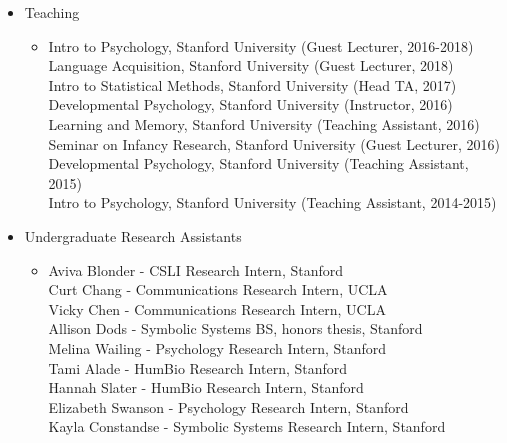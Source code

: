 \documentclass[10pt]{article}
\newenvironment{outerlist}[1][\enskip\textbullet]%
        {\begin{itemize}[#1,leftmargin=*]}{\end{itemize}%
         \vspace{-.6\baselineskip}}
\newenvironment{innerlist}[1][\enskip\textbullet]%
        {\begin{itemize}[#1,leftmargin=*,parsep=0pt,itemsep=0pt,topsep=0pt,partopsep=0pt]}
        {\end{itemize}}
\begin{document}
\begin{outerlist}

\item[] Teaching

\begin{innerlist}
\item[] Intro to Psychology, Stanford University (Guest Lecturer, 2016-2018)\\
        Language Acquisition, Stanford University (Guest Lecturer, 2018)\\
        Intro to Statistical Methods, Stanford University (Head TA, 2017)\\
        Developmental Psychology, Stanford University (Instructor, 2016)\\
        Learning and Memory, Stanford University (Teaching Assistant, 2016)\\
        Seminar on Infancy Research, Stanford University (Guest Lecturer, 2016)\\
        Developmental Psychology, Stanford University (Teaching Assistant, 2015)\\
        Intro to Psychology, Stanford University (Teaching Assistant, 2014-2015)
\end{innerlist}

\item[] Undergraduate Research Assistants

\begin{innerlist}
\item[] Aviva Blonder - CSLI Research Intern, Stanford\\
        Curt Chang - Communications Research Intern, UCLA \\
        Vicky Chen - Communications Research Intern, UCLA \\
        Allison Dods - Symbolic Systems BS, honors thesis, Stanford\\
        Melina Wailing - Psychology Research Intern, Stanford\\
        Tami Alade - HumBio Research Intern, Stanford\\
        Hannah Slater - HumBio Research Intern, Stanford\\
        Elizabeth Swanson - Psychology Research Intern, Stanford\\
        Kayla Constandse - Symbolic Systems Research Intern, Stanford
\end{innerlist}


\end{outerlist}
\end{document}
